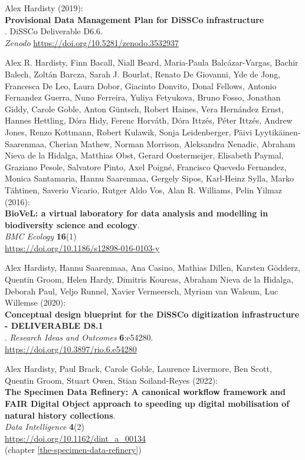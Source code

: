 \begin{thebibliography}{9}
Alex Hardisty (2019):\\
\textbf{Provisional Data Management Plan for DiSSCo infrastructure}\\. 
DiSSCo Deliverable D6.6. \\
\emph{Zenodo}
\url{https://doi.org/10.5281/zenodo.3532937}


Alex R. Hardisty, Finn Bacall, Niall Beard, Maria-Paula Balcázar-Vargas, Bachir Balech, Zoltán Barcza, Sarah J. Bourlat, Renato De Giovanni, Yde de Jong, Francesca De Leo, Laura Dobor, Giacinto Donvito, Donal Fellows, Antonio Fernandez Guerra, Nuno Ferreira, Yuliya Fetyukova, Bruno Fosso, Jonathan Giddy, Carole Goble, Anton Güntsch, Robert Haines, Vera Hernández Ernst, Hannes Hettling, Dóra Hidy, Ferenc Horváth, Dóra Ittzés, Péter Ittzés, Andrew Jones, Renzo Kottmann, Robert Kulawik, Sonja Leidenberger, Päivi Lyytikäinen-Saarenmaa, Cherian Mathew, Norman Morrison, Aleksandra Nenadic, Abraham Nieva de la Hidalga, Matthias Obst, Gerard Oostermeijer, Elisabeth Paymal, Graziano Pesole, Salvatore Pinto, Axel Poigné, Francisco Quevedo Fernandez, Monica Santamaria, Hannu Saarenmaa, Gergely Sipos, Karl-Heinz Sylla, Marko Tähtinen, Saverio Vicario, Rutger Aldo Vos, Alan R. Williams, Pelin Yilmaz (2016):\\
\textbf{BioVeL: a virtual laboratory for data analysis and modelling in biodiversity science and ecology}.\\
\emph{BMC Ecology} \textbf{16}(1)\\
\url{https://doi.org/10.1186/s12898-016-0103-y}

Alex Hardisty, Hannu Saarenmaa, Ana Casino, Mathias Dillen, Karsten Gödderz, Quentin Groom, Helen Hardy, Dimitris Koureas, Abraham Nieva de la Hidalga, Deborah Paul, Veljo Runnel, Xavier Vermeersch, Myriam van Walsum, Luc Willemse (2020):\\
\textbf{Conceptual design blueprint for the DiSSCo
digitization infrastructure - DELIVERABLE D8.1}\\. 
\emph{Research Ideas and Outcomes} \textbf{6}:e54280.\\
\url{https://doi.org/10.3897/rio.6.e54280}

Alex Hardisty, Paul Brack, Carole Goble, Laurence
Livermore, Ben Scott, Quentin Groom, Stuart Owen, Stian Soiland-Reyes
(2022):\\
\textbf{The Specimen Data Refinery: A
canonical workflow framework and FAIR Digital Object approach to
speeding up digital mobilisation of natural history collections}.\\
\emph{Data Intelligence} \textbf{4}(2)\\
\url{https://doi.org/10.1162/dint_a_00134}\\
(chapter \vref{the-specimen-data-refinery})


\end{thebibliography}
